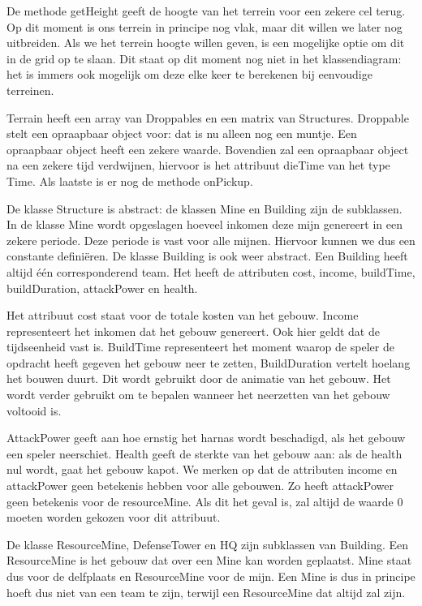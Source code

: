 \documentclass[a4paper,11pt]{article}
\begin{document}
De methode getHeight geeft de hoogte van het terrein voor een zekere cel terug. Op dit moment is ons terrein in principe nog vlak, maar dit willen we later nog uitbreiden. Als we het terrein hoogte willen geven, is een mogelijke optie om dit in de grid op te slaan. Dit staat op dit moment nog niet in het klassendiagram: het is immers ook mogelijk om deze elke keer te berekenen bij eenvoudige terreinen.

Terrain heeft een array van Droppables en een matrix van Structures. Droppable stelt een opraapbaar object voor: dat is nu alleen nog een muntje. Een opraapbaar object heeft een zekere waarde. Bovendien zal een opraapbaar object na een zekere tijd verdwijnen, hiervoor is het attribuut dieTime van het type Time. Als laatste is er nog de methode onPickup.

De klasse Structure is abstract: de klassen Mine en Building zijn de subklassen. In de klasse Mine wordt opgeslagen hoeveel inkomen deze mijn genereert in een zekere periode. Deze periode is vast voor alle mijnen. Hiervoor kunnen we dus een constante defini\"eren. De klasse Building is ook weer abstract. Een Building heeft altijd \'e\'en corresponderend team. Het heeft de attributen cost, income, buildTime, buildDuration, attackPower en health.

Het attribuut cost staat voor de totale kosten van het gebouw. Income representeert het inkomen dat het gebouw genereert. Ook hier geldt dat de tijdseenheid vast is. BuildTime representeert het moment waarop de speler de opdracht heeft gegeven het gebouw neer te zetten, BuildDuration vertelt hoelang het bouwen duurt. Dit wordt gebruikt door de animatie van het gebouw. Het wordt verder gebruikt om te bepalen wanneer het neerzetten van het gebouw voltooid is. 

AttackPower geeft aan hoe ernstig het harnas wordt beschadigd, als het gebouw een speler neerschiet. Health geeft de sterkte van het gebouw aan: als de health nul wordt, gaat het gebouw kapot. We merken op dat de attributen income en attackPower geen betekenis hebben voor alle gebouwen. Zo heeft attackPower geen betekenis voor de resourceMine. Als dit het geval is, zal altijd de waarde 0 moeten worden gekozen voor dit attribuut.

De klasse ResourceMine, DefenseTower en HQ zijn subklassen van Building. Een ResourceMine is het gebouw dat over een Mine kan worden geplaatst. Mine staat dus voor de delfplaats en ResourceMine voor de mijn. Een Mine is dus in principe hoeft dus niet van een team te zijn, terwijl een ResourceMine dat altijd zal zijn.
\end{document}
